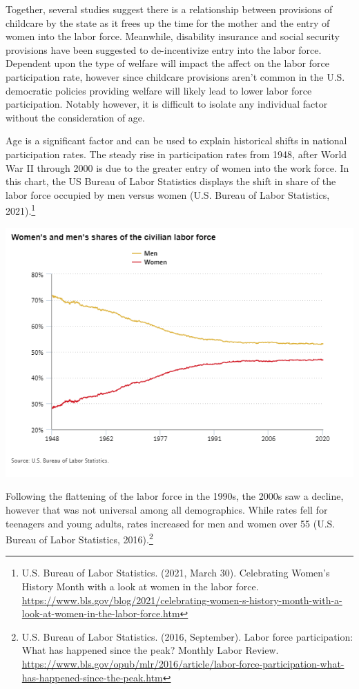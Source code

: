 Together, several studies suggest there is a relationship between provisions of childcare by the state as it frees up the time for the mother and the entry of women into the labor force. Meanwhile, disability insurance and social security provisions have been suggested to de-incentivize entry into the labor force. Dependent upon the type of welfare will impact the affect on the labor force participation rate, however since childcare provisions aren't common in the U.S. democratic policies providing welfare will likely lead to lower labor force participation. Notably however, it is difficult to isolate any individual factor without the consideration of age.

Age is a significant factor and can be used to explain historical shifts in national participation rates. The steady rise in participation rates from 1948, after World War II through 2000 is due to the greater entry of women into the work force. In this chart, the US Bureau of Labor Statistics displays the shift in share of the labor force occupied by men versus women (U.S. Bureau of Labor Statistics, 2021).\footnote{U.S. Bureau of Labor Statistics. (2021, March 30). Celebrating Women's History Month with a look at women in the labor force. \href{https://www.bls.gov/blog/2021/celebrating-women-s-history-month-with-a-look-at-women-in-the-labor-force.htm}{https://www.bls.gov/blog/2021/celebrating-women-s-history-month-with-a-look-at-women-in-the-labor-force.htm}}

\includegraphics[width=0.7\linewidth]{files/women-73c868b7c60b99ec32c4060e9621d3c8.png}

Following the flattening of the labor force in the 1990s, the 2000s saw a decline, however that was not universal among all demographics. While rates fell for teenagers and young adults, rates increased for men and women over 55 (U.S. Bureau of Labor Statistics, 2016).\footnote{U.S. Bureau of Labor Statistics. (2016, September). Labor force participation: What has happened since the peak? Monthly Labor Review. \href{https://www.bls.gov/opub/mlr/2016/article/labor-force-participation-what-has-happened-since-the-peak.htm}{https://www.bls.gov/opub/mlr/2016/article/labor-force-participation-what-has-happened-since-the-peak.htm}}

